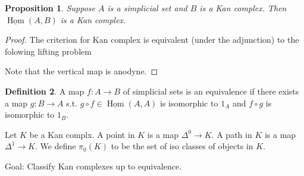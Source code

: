 \documentclass{article}
\theoremstyle{definition}
\newtheorem{defn}{Definition}[section]
\theoremstyle{remark}
\theoremstyle{plain}
\newtheorem{prop}[defn]{Proposition}
\newcommand{\Hom}{\operatorname{Hom}}
\begin{document}
\begin{prop}
    Suppose $A$ is a simplicial set and $B$ is a Kan complex. Then $\underline{\Hom}(A,B)$ is a Kan complex.
\end{prop}
\begin{proof}
    The criterion for Kan complex is equivalent (under the adjunction) to the folowing lifting problem
    \begin{center}
    \end{center}
    Note that the vertical map is anodyne.
\end{proof}

\begin{defn}
    A map $f:A\to B$ of simplicial sets is an equivalence if there exists a map $g:B\to A$ s.t. $g\circ f\in\underline{\Hom}(A,A)$ is isomorphic to $1_A$ and $f\circ g$ is isomorphic to $1_B$.
\end{defn}

Let $K$ be a Kan complx. A point in $K$ is a map $\Delta^0\to K$. A path in $K$ is a map $\Delta^1\to K$. We define $\pi_0(K)$ to be the set of iso classes of objects in $K$. 

Goal: Classify Kan complexes up to equivalence.
\end{document}
